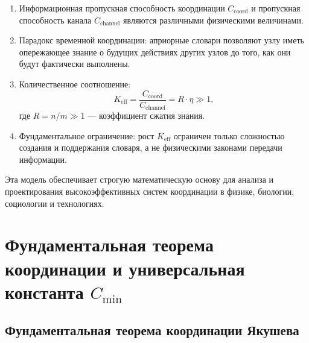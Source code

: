 \documentclass[11pt,a4paper]{article}
\begin{document}
	\begin{enumerate}
		\item Информационная пропускная способность координации $C_{\text{coord}}$ и пропускная способность канала $C_{\text{channel}}$ являются различными физическими величинами.
		
		\item Парадокс временной координации: априорные словари позволяют узлу иметь опережающее знание о будущих действиях других узлов до того, как они будут фактически выполнены.
		
		\item Количественное соотношение:
		\[
		K_{\mathrm{eff}} = \frac{C_{\text{coord}}}{C_{\text{channel}}} = R \cdot \eta \gg 1,
		\]
		где $R = n/m \gg 1$ — коэффициент сжатия знания.
		
		\item Фундаментальное ограничение: рост $K_{\mathrm{eff}}$ ограничен только сложностью создания и поддержания словаря, а не физическими законами передачи информации.
	\end{enumerate}
	
	Эта модель обеспечивает строгую математическую основу для анализа и проектирования высокоэффективных систем координации в физике, биологии, социологии и технологиях.
	
	
	\section{Фундаментальная теорема координации и универсальная константа \texorpdfstring{$C_{\min}$}{C\_min}}
	\label{sec:fundamental-theorem}
	
	\subsection{Фундаментальная теорема координации Якушева}
	
\end{document}
